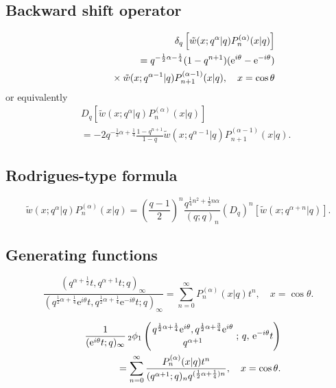 \documentclass[envcountchap,graybox]{svmono}
\newcommand{\qhyp}[5]{\mbox{}_{#1}{\phi}_{#2}
\left(\genfrac{}{}{0pt}{}{#3}{#4}\,;\,q,\,#5\right)}
\newcommand{\mathindent}{\hspace{7.5mm}}
\newcommand{\e}{\textrm{e}}
\newcommand{\qhyp}[5]{\,\mbox{}_{#1}\phi_{#2}\!\left(
  \genfrac{}{}{0pt}{}{#3}{#4};#5\right)}
\begin{document}
{{\subsection*{Backward shift operator}
\begin{eqnarray}
\label{shift2ContqLaguerreI}
& &\delta_q\left[{\tilde w}(x;q^{\alpha}|q)P_n^{(\alpha)}(x|q)\right]\nonumber\\
& &{}=q^{-\frac{1}{2}\alpha-\frac{1}{4}}(1-q^{n+1})(\e^{i\theta}-\e^{-i\theta})\nonumber\\
& &{}\mathindent{}\times
{\tilde w}(x;q^{\alpha-1}|q)P_{n+1}^{(\alpha-1)}(x|q),\quad x=\cos\theta
\end{eqnarray}
or equivalently
\begin{eqnarray}
\label{shift2ContqLaguerreII}
& &D_q\left[{\tilde w}(x;q^{\alpha}|q)P_n^{(\alpha)}(x|q)\right]\nonumber\\
& &{}=-2q^{-\frac{1}{2}\alpha+\frac{1}{4}}\frac{1-q^{n+1}}{1-q}
{\tilde w}(x;q^{\alpha-1}|q)P_{n+1}^{(\alpha-1)}(x|q).
\end{eqnarray}

\subsection*{Rodrigues-type formula}
\begin{equation}
\label{RodContqLaguerre}
{\tilde w}(x;q^{\alpha}|q)P_n^{(\alpha)}(x|q)=\left(\frac{q-1}{2}\right)^n
\frac{q^{\frac{1}{4}n^2+\frac{1}{2}n\alpha}}{(q;q)_n}
\left(D_q\right)^n\left[{\tilde w}(x;q^{\alpha+n}|q)\right].
\end{equation}

\subsection*{Generating functions}
\begin{equation}
\label{GenContqLaguerre1}
\frac{(q^{\alpha+\frac{1}{2}}t,q^{\alpha+1}t;q)_{\infty}}
{(q^{\frac{1}{2}\alpha+\frac{1}{4}}\e^{i\theta}t,q^{\frac{1}{2}\alpha+\frac{1}{4}}\e^{-i\theta}t;q)_{\infty}}
=\sum_{n=0}^{\infty}P_n^{(\alpha)}(x|q)t^n,\quad x=\cos\theta.
\end{equation}

\begin{eqnarray}
\label{GenContqLaguerre2}
& &\frac{1}{(\e^{i\theta}t;q)_{\infty}}\,\qhyp{2}{1}{q^{\frac{1}{2}\alpha+\frac{1}{4}}\e^{i\theta},
q^{\frac{1}{2}\alpha+\frac{3}{4}}\e^{i\theta}}{q^{\alpha+1}}{\e^{-i\theta}t}\nonumber\\
& &{}=\sum_{n=0}^{\infty}\frac{P_n^{(\alpha)}(x|q)t^n}{(q^{\alpha+1};q)_nq^{(\frac{1}{2}\alpha+\frac{1}{4})n}},
\quad x=\cos\theta.
\end{eqnarray}

}}
\end{document}
